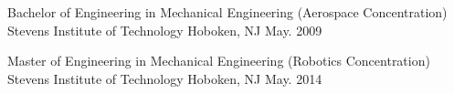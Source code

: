 
\begin{cventries}

  \cventry
    {Bachelor of Engineering in Mechanical Engineering (Aerospace Concentration)} %
    {Stevens Institute of Technology} %
    {Hoboken, NJ} %
    {May. 2009} %
    { } %

  \cventry
    {Master of Engineering in Mechanical Engineering (Robotics Concentration)} %
    {Stevens Institute of Technology} %
    {Hoboken, NJ} %
    {May. 2014} %
    { } %
\end{cventries}
